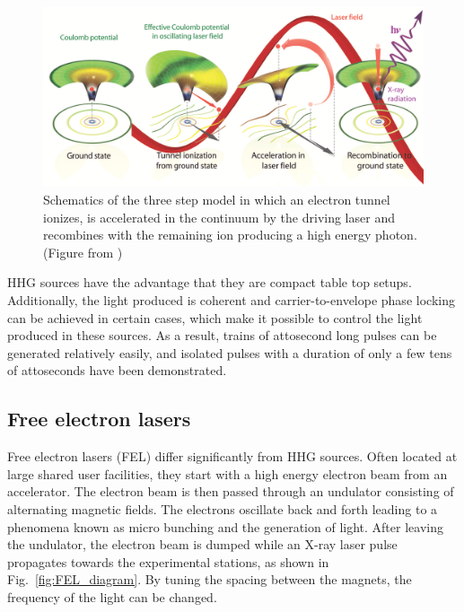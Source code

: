 \begin{figure}[!ht]
\centering
\includegraphics[width=0.8\columnwidth]{figs/Intro/HHG.png}
\caption{\label{fig:hhg_3_step} Schematics of the three step model in which an electron tunnel ionizes, is accelerated in the continuum by the driving laser and recombines with the remaining ion producing a high energy photon. (Figure from \cite{popmintchev2010})
}
\end{figure}

HHG sources have the advantage that they are compact table top setups. Additionally, the light produced is coherent and carrier-to-envelope phase locking can be achieved in certain cases, which make it possible to control the light produced in these sources. As a result, trains of attosecond long pulses can be generated relatively easily, and isolated pulses with a duration of only a few tens of attoseconds have been demonstrated. 

\subsection{Free electron lasers} %
\label{sub:free_electron_lasers}
Free electron lasers (FEL) differ significantly from HHG sources. Often located at large shared user facilities, they start with a high energy electron beam from an accelerator. The electron beam is then passed through an undulator consisting of alternating magnetic fields. The electrons oscillate back and forth leading to a phenomena known as micro bunching and the generation of light. After leaving the undulator, the electron beam is dumped while an X-ray laser pulse propagates towards the experimental stations, as shown in Fig.~\ref{fig:FEL_diagram}. By tuning the spacing between the magnets, the frequency of the light can be changed. 

